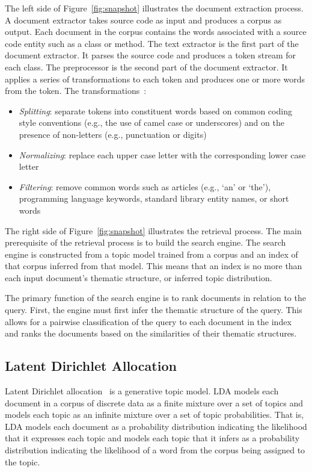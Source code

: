The left side of Figure~\ref{fig:snapshot} illustrates the document extraction
process.  A document extractor takes source code as input and produces a corpus
as output.  Each document in the corpus contains the words associated with
a source code entity such as a class or method.  The text extractor is the first
part of the document extractor.  It parses the source code and produces a token
stream for each class.  The preprocessor is the second part of the document
extractor.  It applies a series of transformations to each token and produces
one or more words from the token.
The transformations~\cite{Marcus-etal:2004,Marcus-Menzies:2010}: %
\begin{itemize}
    \item {\it Splitting}: separate tokens into constituent words based on
        common coding style conventions (e.g., the use of camel case or
        underscores) and on the presence of non-letters (e.g., punctuation or
        digits)
    \item {\it Normalizing}: replace each upper case letter with the
        corresponding lower case letter
    \item {\it Filtering}: remove common words such as articles (e.g., `an' or
        `the'), programming language keywords, standard library entity names, or
        short words
\end{itemize}

The right side of Figure~\ref{fig:snapshot} illustrates the retrieval process.
The main prerequisite of the retrieval process is to build the search engine.
The search engine is constructed from a topic model trained from a corpus and an
index of that corpus inferred from that model.
This means that an index is no more than each input document's thematic
structure, or inferred topic distribution.

The primary function of the search engine is to rank documents in relation to
the query.  First, the engine must first infer the thematic structure of the
query.  This allows for a pairwise classification of the query to each document
in the index and ranks the documents based on the similarities of their thematic
structures.

\subsection{Latent Dirichlet Allocation}

Latent Dirichlet allocation~\cite{Blei-etal:2003} is a generative topic model.
LDA models each document in a corpus of discrete data as a finite mixture over
a set of topics and models each topic as an infinite mixture over a set of
topic probabilities.  That is, LDA models each document as a probability
distribution indicating the likelihood that it expresses each topic and models
each topic that it infers as a probability distribution indicating the
likelihood of a word from the corpus being assigned to the topic.

